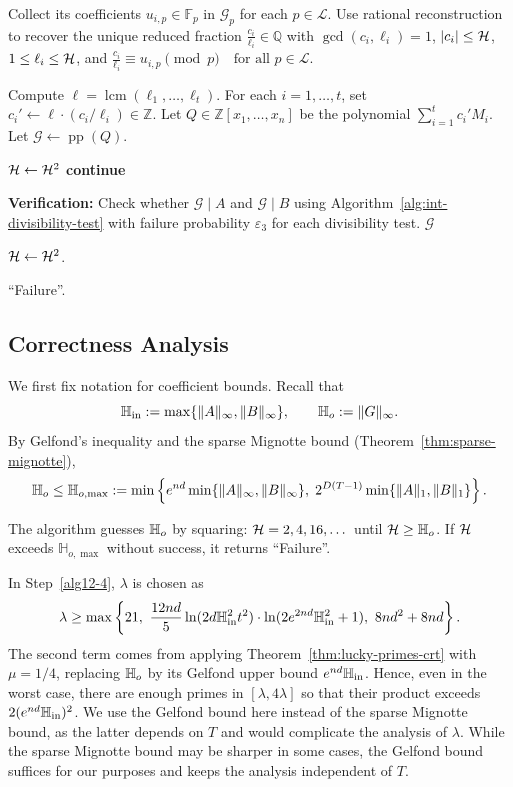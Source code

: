 \documentclass{article}
\numberwithin{equation}{section}
\begin{document}
\begin{algorithm}[p]
\begin{algorithmic}[1]
    \State Collect its coefficients $u_{i,p} \in \mathbb{F}_p$ in $\mathcal{G}_p$ for each $p \in \mathcal{L}$.
    \State Use rational reconstruction to recover the unique reduced fraction
   $ \frac{c_i}{\ell_i} \in \mathbb{Q}$
    with $\gcd(c_i, \ell_i) = 1$, $|c_i| \le {\mathcal{H}}$, $1 \le \ell_i \le {\mathcal{H}}$, and
   $\frac{c_i}{\ell_i} \equiv u_{i,p} \pmod{p} \quad \text{for all } p \in \mathcal{L}.$
\EndFor

\State Compute $\ell = \operatorname{lcm}(\ell_1, \dots, \ell_t)$. For each $i = 1,\dots,t$, set $c_i' \gets \ell \cdot (c_i / \ell_i) \in \mathbb{Z}$.
\State Let $Q \in \mathbb{Z}[x_1,\dots,x_n]$ be the polynomial $\sum_{i=1}^t c_i' M_i$.
%
Let $\mathcal{G} \gets \operatorname{pp}(Q)$.

    \State ${\mathcal{H}} \gets {\mathcal{H}}^2$
    \State \textbf{continue}
\EndIf

\State \textbf{Verification:} Check whether $\mathcal{G} \mid A$ and $\mathcal{G} \mid B$ using Algorithm~\ref{alg:int-divisibility-test} with failure probability $\varepsilon_3$ for each divisibility test.
    \State \Return $\mathcal{G}$
\EndIf

\State ${\mathcal{H}} \gets {\mathcal{H}}^2$. 
   

\EndWhile

\State \Return ``Failure''.
\end{algorithmic}
\end{algorithm}


\subsection*{Correctness Analysis}

We first fix notation for coefficient bounds. Recall that
\[
\mathbb{H}_{\rm in} := \max\{\|A\|_\infty, \|B\|_\infty\}, \qquad \mathbb{H}_{o} := \|G\|_\infty.
\]
By Gelfond's inequality and the sparse Mignotte bound (Theorem~\ref{thm:sparse-mignotte}),
\[
\mathbb{H}_{o} \le \mathbb{H}_{o,\max}
:= \min\left\{ e^{nd}\min\{\|A\|_\infty,\|B\|_\infty\},\;
2^{D(T-1)}\min\{\|A\|_1,\|B\|_1\}\right\}.
\]

The algorithm guesses $\mathbb{H}_{o}$ by squaring: ${\mathcal{H}} = 2,4,16,\dots$ until ${\mathcal{H}} \ge \mathbb{H}_{o}$. If ${\mathcal{H}}$ exceeds $\mathbb{H}_{o,\max}$ without success, it returns ``Failure''.

In Step~\ref{alg12-4}, $\lambda$ is chosen as
\[
\lambda \ge \max\left\{
    21,\ 
    \frac{12nd}{5} \ln(2d \Hi^2 t^2) \cdot \ln(2e^{2nd}\Hi^2+1),\ 
    8nd^2 + 8nd
\right\}.
\]
The second term comes from applying Theorem~\ref{thm:lucky-primes-crt} with $\mu = 1/4$, replacing $\mathbb{H}_{o}$ by its Gelfond upper bound $e^{nd}\mathbb{H}_{\rm in}$. Hence, even in the worst case, there are enough primes in $[\lambda,4\lambda]$ so that their product exceeds $2(e^{nd}\mathbb{H}_{\rm in})^2$. We use the Gelfond bound here instead of the sparse Mignotte bound, as the latter depends on $T$ and would complicate the analysis of $\lambda$. While the sparse Mignotte bound may be sharper in some cases, the Gelfond bound suffices for our purposes and keeps the analysis independent of $T$.
\end{document}
